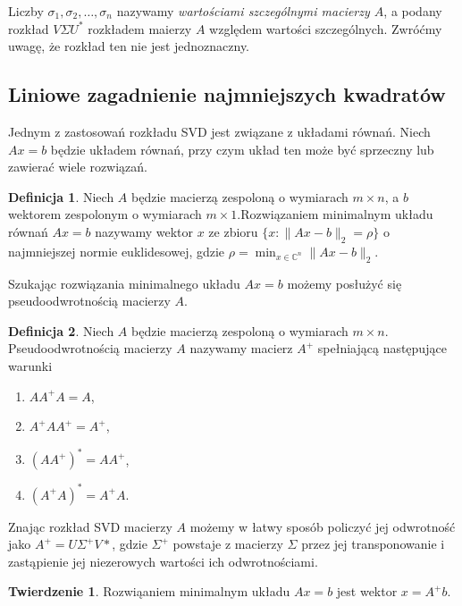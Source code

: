 \documentclass[12pt,a4paper]{article}
\theoremstyle{definition}
\newtheorem{twie}{Twierdzenie}
\newtheorem{de}{Definicja}
\begin{document}
	Liczby $\sigma_1,\sigma_2,\ldots, \sigma_n$ nazywamy \emph{wartościami szczególnymi macierzy $A$}, a podany rozkład $V\Sigma U^*$ rozkładem maierzy $A$ względem wartości szczególnych. Zwróćmy uwagę, że rozkład ten nie jest jednoznaczny.\\
	\subsection*{Liniowe zagadnienie najmniejszych kwadratów}
	Jednym z zastosowań rozkładu SVD jest związane z układami równań. Niech $Ax=b$ będzie układem równań, przy czym układ ten może być sprzeczny lub zawierać wiele rozwiązań. 
	\begin{de}
		Niech $A$ będzie macierzą zespoloną o wymiarach $m\times n$, a $b$ wektorem zespolonym o wymiarach $m\times 1$.Rozwiązaniem minimalnym układu równań $Ax=b$ nazywamy wektor $x$ ze zbioru $\{x:\|Ax-b\|_2=\rho\}$ o najmniejszej normie euklidesowej, gdzie $\rho=\min_{x\in \mathbb{C}^n}\|Ax-b\|_2$.
	\end{de}
	Szukając rozwiązania minimalnego układu $Ax=b$ możemy posłużyć się pseudoodwrotnością macierzy $A$.
	\begin{de}
		Niech $A$ będzie macierzą zespoloną o wymiarach $m\times n$. Pseudoodwrotnością macierzy $A$ nazywamy macierz  $A^+$ spełniającą następujące warunki
		\begin{enumerate}
			\item $AA^+A=A$,
			\item $A^+AA^+=A^+$,
			\item $(AA^+)^*=AA^+$,
			\item $(A^+A)^*=A^+A$.		
		\end{enumerate}
	\end{de}
	Znając rozkład SVD macierzy $A$ możemy w łatwy sposób policzyć jej odwrotność jako $A^+=U\Sigma^+V*$, gdzie $\Sigma^+$ powstaje z macierzy $\Sigma$ przez jej transponowanie i zastąpienie jej niezerowych wartości ich odwrotnościami. 
	\begin{twie}
		Rozwiąaniem minimalnym układu $Ax=b$ jest wektor $x=A^+b$.
	\end{twie}
	
\end{document}
